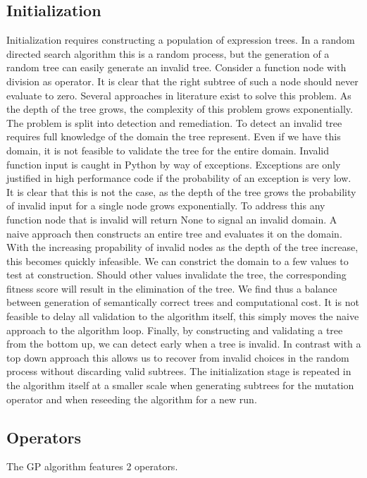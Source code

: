\documentclass[10pt]{extarticle}
\begin{document}
\subsection{Initialization}
Initialization requires constructing a population of expression trees. In a random directed search algorithm this is a random process, but the generation of a random tree can easily generate an invalid tree. Consider a function node with division as operator. It is clear that the right subtree of such a node should never evaluate to zero. 
Several approaches in literature exist %
to solve this problem.
As the depth of the tree grows, the complexity of this problem grows exponentially.
The problem is split into detection and remediation.
To detect an invalid tree requires full knowledge of the domain the tree represent. Even if we have this domain, it is not feasible to validate the tree for the entire domain. 
Invalid function input is caught in Python by way of exceptions. 
Exceptions are only justified in high performance code if the probability of an exception is very low. 
It is clear that this is not the case, as the depth of the tree grows the probability of invalid input for a single node grows exponentially. To address this any function node that is invalid will return None to signal an invalid domain.
A naive approach then constructs an entire tree and evaluates it on the domain. 
With the increasing propability of invalid nodes as the depth of the tree increase, this becomes quickly infeasible.
We can constrict the domain to a few values to test at construction. 
Should other values invalidate the tree, the corresponding fitness score will result in the elimination of the tree.
We find thus a balance between generation of semantically correct trees and computational cost. 
It is not feasible to delay all validation to the algorithm itself, this simply moves the naive approach to the algorithm loop.
Finally, by constructing and validating a tree from the bottom up, we can detect early when a tree is invalid. 
In contrast with a top down approach this allows us to recover from invalid choices in the random process without discarding valid subtrees.
The initialization stage is repeated in the algorithm itself at a smaller scale when generating subtrees for the mutation operator and when reseeding the algorithm for a new run.

\subsection{Operators}
The GP algorithm features 2 operators.
\end{document}
